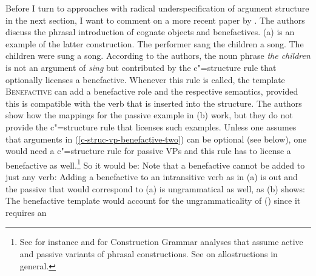 Before I turn to approaches with radical underspecification of argument structure in the next
section, I want to comment on a more recent paper by \citet*{AGT2014a}. The authors discuss the
phrasal introduction of cognate objects and benefactives. (a) is an example of the latter construction. 
\eal
\ex The performer sang the children a song.
\ex The children were sung a song. 
\zl
According to the authors, the noun phrase \emph{the children} is not an argument of \emph{sing} but
contributed by the c"=structure rule that optionally licenses a benefactive.
\ea\label{c-struc-vp-benefactive-two}
\z
Whenever this rule is called, the template \textsc{Benefactive} can add a benefactive role and the
respective semantics, provided this is compatible with the verb that is inserted into the structure. The
authors show how the mappings for the passive example in (b) work, but they do not provide
the c"=structure rule that licenses such examples. Unless one assumes that arguments in
(\ref{c-struc-vp-benefactive-two}) can be optional (see below), one would need a c"=structure rule for
passive VPs and this rule has to license a benefactive as well.\footnote{%
  See for instance  and  for Construction Grammar analyses that assume active
  and passive variants of phrasal constructions. See  on allostructions in general.
  } So it would be:
\ea\label{c-struc-vp-benefactive-passive}
\z
Note that a benefactive cannot be added to just any verb: Adding a benefactive to an intransitive verb as
in (a) is out and the passive that would correspond to (a) is ungrammatical as well,
as (b) shows:
\eal
{}
\zl
The benefactive template would account for the ungrammaticality of () since it requires an

